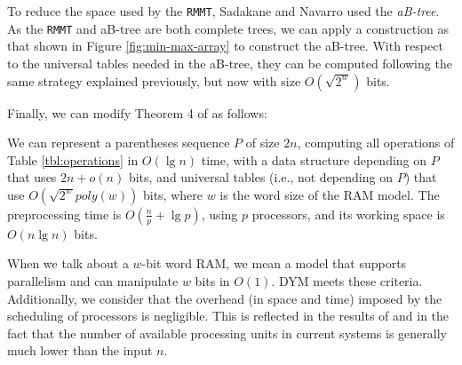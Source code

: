 To reduce the space used by the {\tt RMMT}, Sadakane and Nava\-rro used
the \emph{aB-tree}. As the {\tt RMMT} and aB-tree are both complete trees, we can apply a
construction as that shown in Figure \ref{fig:min-max-array} to
construct the aB-tree. With respect to the universal tables needed in
the aB-tree, they can be computed following the same strategy
explained previously, but now with size $O(\sqrt{2^{w}})$
bits.

Finally, we can modify Theorem 4 of
\cite{Navarro:2014:FFS:2620785.2601073} as follows:

\begin{theorem}
  We can represent a parentheses sequence $P$ of size $2n$, computing all
  operations of Table \ref{tbl:operations}
  in $O(\lg n)$ time, with a data
  structure depending on $P$ that uses $2n+o(n)$ bits, and universal
  tables (i.e., not depending on $P$) that use $O(\sqrt{2^{w}}poly(w))$
  bits, where $w$ is the word size of the RAM model. The preprocessing
  time is $O(\frac{n}{p} + \lg p)$, using $p$
  processors, and its working space is $O(n\lg n)$ bits.
\end{theorem}
			
When we talk about a $w$-bit word RAM, we mean a model that supports
parallelism and can manipulate $w$ bits in $O(1)$. DYM meets these
criteria. Additionally, we consider that the overhead (in space and
time) imposed by the scheduling of processors is negligible. This is
reflected in the results of \cite{Blumofe:1999:SMC:324133.324234} and in the fact that the number of available processing units in current systems is generally much lower than the input $n$.
